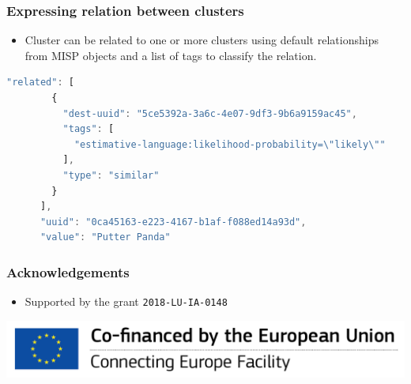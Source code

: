 \begin{frame}[fragile]
        \frametitle{Expressing relation between clusters}
        \begin{itemize}
                \item Cluster can be related to one or more clusters using default relationships from MISP objects and a list of tags to classify the relation.
        \end{itemize}

        \begin{lstlisting}[language=javascript,firstnumber=1]
        "related": [
        {
          "dest-uuid": "5ce5392a-3a6c-4e07-9df3-9b6a9159ac45",
          "tags": [
            "estimative-language:likelihood-probability=\"likely\""
          ],
          "type": "similar"
        }
      ],
      "uuid": "0ca45163-e223-4167-b1af-f088ed14a93d",
      "value": "Putter Panda"
        \end{lstlisting}
\end{frame}


\begin{frame}
    \frametitle{Acknowledgements}
    \begin{itemize}
        \item Supported by the grant \texttt{2018-LU-IA-0148}
    \end{itemize}
    \begin{center}
        \includegraphics[scale=0.7]{en_cef.png}
    \end{center}
\end{frame}

